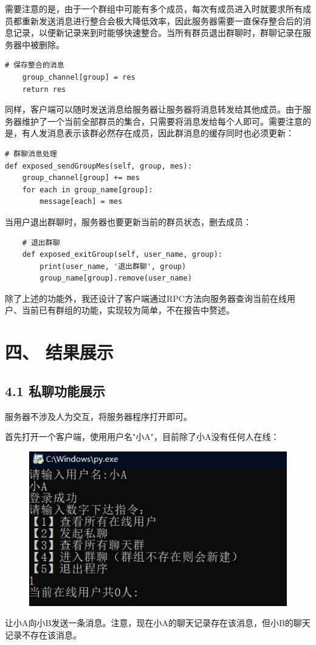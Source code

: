 \documentclass{report}
\begin{document}
需要注意的是，由于一个群组中可能有多个成员，每次有成员进入时就要求所有成员都重新发送消息进行整合会极大降低效率，因此服务器需要一直保存整合后的消息记录，以便新记录来到时能够快速整合。当所有群员退出群聊时，群聊记录在服务器中被删除。
\begin{lstlisting}
# 保存整合的消息
    group_channel[group] = res
    return res
\end{lstlisting}
同样，客户端可以随时发送消息给服务器让服务器将消息转发给其他成员。由于服务器维护了一个当前全部群员的集合，只需要将消息发给每个人即可。需要注意的是，有人发消息表示该群必然存在成员，因此群消息的缓存同时也必须更新：
\begin{lstlisting}
# 群聊消息处理
def exposed_sendGroupMes(self, group, mes):
    group_channel[group] += mes
    for each in group_name[group]:
        message[each] = mes
\end{lstlisting}
当用户退出群聊时，服务器也要更新当前的群员状态，删去成员：
\begin{lstlisting}
    # 退出群聊
    def exposed_exitGroup(self, user_name, group):
        print(user_name, '退出群聊', group)
        group_name[group].remove(user_name)
\end{lstlisting}
除了上述的功能外，我还设计了客户端通过RPC方法向服务器查询当前在线用户、当前已有群组的功能，实现较为简单，不在报告中赘述。
\section*{四、 结果展示}
\subsection*{4.1 私聊功能展示}
服务器不涉及人为交互，将服务器程序打开即可。

首先打开一个客户端，使用用户名"小A"，目前除了小A没有任何人在线：

\begin{figure}[h]\centering
\includegraphics[scale=0.3]{pic/1.png}
\end{figure}
让小A向小B发送一条消息。注意，现在小A的聊天记录存在该消息，但小B的聊天记录不存在该消息。
\end{document}
